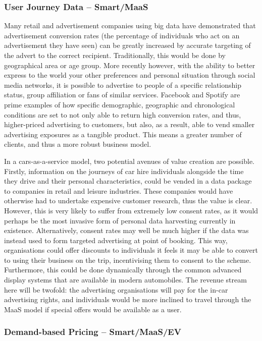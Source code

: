 \documentclass[journal]{IEEEtran}
\begin{document}
\subsubsection{User Journey Data – Smart/MaaS}

Many retail and advertisement companies using big data have
demonstrated that advertisement conversion rates (the percentage of
individuals who act on an advertisement they have seen) can be greatly
increased by accurate targeting of the advert to the correct
recipient. Traditionally, this would be done by geographical area or
age group. More recently however, with the ability to better express
to the world your other preferences and personal situation through
social media networks, it is possible to advertise to people of a
specific relationship status, group affiliation or fans of similar
services. Facebook and Spotify are prime examples of how specific
demographic, geographic and chronological conditions are set to not
only able to return high conversion rates, and thus, higher-priced
advertising to customers, but also, as a result, able to vend smaller
advertising exposures as a tangible product. This means a greater
number of clients, and thus a more robust business model.

In a cars-as-a-service model, two potential avenues of value creation
are possible. Firstly, information on the journeys of car hire
individuals alongside the time they drive and their personal
characteristics, could be vended in a data package to companies in
retail and leisure industries. These companies would have otherwise
had to undertake expensive customer research, thus the value is
clear. However, this is very likely to suffer from extremely low
consent rates, as it would perhaps be the most invasive form of
personal data harvesting currently in existence. Alternatively,
consent rates may well be much higher if the data was instead used to
form targeted advertising at point of booking. This way, organisations
could offer discounts to individuals it feels it may be able to
convert to using their business on the trip, incentivising them to
consent to the scheme. Furthermore, this could be done dynamically
through the common advanced display systems that are available in
modern automobiles. The revenue stream here will be twofold: the
advertising organisations will pay for the in-car advertising rights,
and individuals would be more inclined to travel through the MaaS
model if special offers would be available as a user.


\subsubsection{Demand-based Pricing -- Smart/MaaS/EV}
\end{document}
